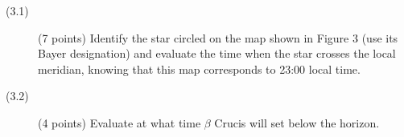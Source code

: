 
\begin{description}
\item[(3.1)] (7 points) Identify the star circled on the map shown in
  Figure 3 (use its Bayer designation) and evaluate the time when the star
  crosses the local meridian, knowing that this map corresponds to 23:00 local
  time.
\item[(3.2)] (4 points) Evaluate at what time $\beta$ Crucis will set below
  the horizon.
\end{description}
